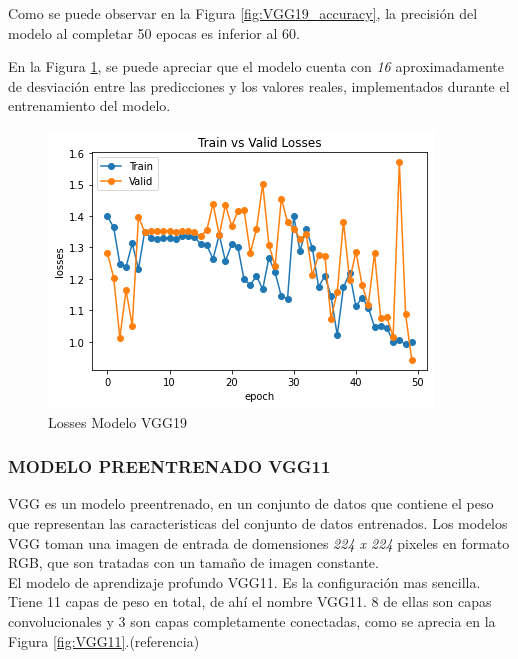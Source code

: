 				Como se puede observar en la Figura \ref{fig:VGG19_accuracy}, la precisión del modelo al completar 50 epocas es inferior al 60.
				
				En la Figura \ref{fig:VGG19_losses}, se puede apreciar que el modelo cuenta con \textit{16} aproximadamente de desviación entre las predicciones y los valores reales, implementados durante el entrenamiento del modelo.
				
				\begin{figure}[ht]
					\centering
					\includegraphics[scale=0.55]{Figs/102.png}
					\caption{Losses Modelo VGG19}
					\label{fig:VGG19_losses}
				\end{figure}
				
\newpage
			\subsubsection{\MakeUppercase{Modelo preentrenado VGG11}}
			VGG es un modelo preentrenado, en un conjunto de datos que contiene el peso que representan las caracteristicas del conjunto de datos entrenados. Los modelos VGG toman una imagen de entrada de domensiones \textit{224 x 224} pixeles en formato RGB, que son tratadas con un tamaño de imagen constante.
			\\
			 El modelo de aprendizaje profundo VGG11. Es la configuración mas sencilla. Tiene 11 capas de peso en total, de ahí el nombre VGG11. 8 de ellas son capas convolucionales y 3 son capas completamente conectadas, como se aprecia en la Figura \ref{fig:VGG11}.(referencia)
			
